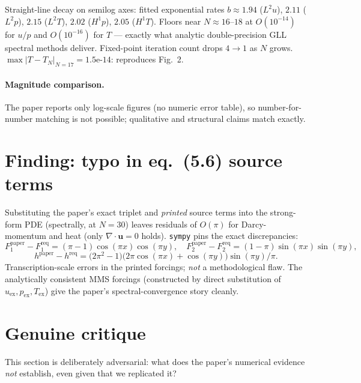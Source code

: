 \documentclass[11pt]{article}
\begin{document}
Straight-line decay on semilog axes: fitted exponential rates $b\!\approx\!1.94$ ($L^2u$),
$2.11$ ($L^2p$), $2.15$ ($L^2T$), $2.02$ ($H^1p$), $2.05$ ($H^1T$). Floors near $N\!\approx\!16$--$18$
at $O(10^{-14})$ for $u/p$ and $O(10^{-16})$ for $T$ --- exactly what analytic double-precision GLL
spectral methods deliver. Fixed-point iteration count drops $4\to 1$ as $N$ grows.
$\max|T-T_N|_{N=17}=1.5\text{e-}14$: reproduces Fig.~2.

\paragraph{Magnitude comparison.} The paper reports only log-scale figures (no numeric error
table), so number-for-number matching is not possible; qualitative and structural claims match
exactly.

\section{Finding: typo in eq.~(5.6) source terms}
\label{sec:typo}
Substituting the paper's exact triplet and \emph{printed} source terms into the strong-form PDE
(spectrally, at $N=30$) leaves residuals of $O(\pi)$ for Darcy-momentum and heat (only
$\nabla\!\cdot\!\mathbf{u}=0$ holds). \texttt{sympy} pins the exact discrepancies:
\[
F_1^{\text{paper}}-F_1^{\text{req}} = (\pi-1)\cos(\pi x)\cos(\pi y),\quad
F_2^{\text{paper}}-F_2^{\text{req}} = (1-\pi)\sin(\pi x)\sin(\pi y),
\]
\[
h^{\text{paper}}-h^{\text{req}} = \bigl(2\pi^2-1\bigr)\bigl(2\pi\cos(\pi x)+\cos(\pi y)\bigr)\sin(\pi y)/\pi.
\]
Transcription-scale errors in the printed forcings; \emph{not} a methodological flaw. The
analytically consistent MMS forcings (constructed by direct substitution of $u_{\text{ex}},
p_{\text{ex}},T_{\text{ex}}$) give the paper's spectral-convergence story cleanly.

\section{Genuine critique}
\label{sec:critique}
This section is deliberately adversarial: what does the paper's numerical evidence
\emph{not} establish, even given that we replicated it?
\end{document}

